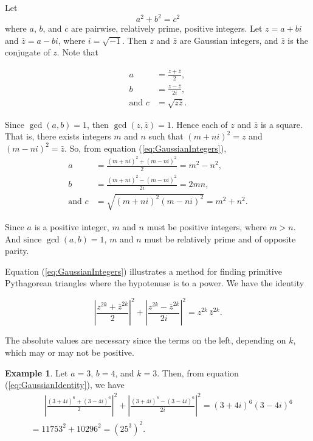 \documentclass{article}
\theoremstyle{definition}
\newtheorem{example}{Example}[section]
\begin{document}
Let
\begin{equation}
a^2 + b^2 = c^2
\label{eq:pythag}
\end{equation}
where \(a\), \(b\), and \(c\) are pairwise, relatively prime, positive integers. Let \(z=a+bi\) and  \(\bar{z}=a-bi\), where \(i=\sqrt{-1}\). Then \(z\) and \(\bar{z}\) are Gaussian integers, and \(\bar{z}\) is the conjugate of \(z\). Note that

\begin{equation}
\begin{aligned}
a &= \frac{z + \bar{z}}{2}, \\
b &= \frac{z - \bar{z}}{2i}, \\
\text{and } c &= \sqrt{z \bar{z}}.
\end{aligned}
\label{eq:GaussianIntegers}
\end{equation}

Since  \(\gcd(a,b)=1\), then  \(\gcd(z,\bar{z})=1\). Hence each of \(z\) and \(\bar{z}\) is a square. That is, there exists integers \(m\) and \(n\) such that  \((m+ni)^2 = z\) and  \((m-ni)^2 = \bar{z}\). So, from equation (\ref{eq:GaussianIntegers}), \[\begin{aligned} a &= \frac{(m+ni)^2 + (m-ni)^2}{2} = m^2-n^2, \\ b &= \frac{(m+ni)^2 - (m-ni)^2}{2i} = 2mn, \\ \text{and } c &= \sqrt{(m+ni)^2(m-ni)^2} = m^2+n^2. \end{aligned}\]

Since \(a\) is a positive integer, \(m\) and \(n\) must be positive integers, where \(m > n\). And since  \(\gcd(a,b) = 1\), \(m\) and \(n\) must be relatively prime and of opposite parity.

Equation (\ref{eq:GaussianIntegers}) illustrates a method for finding primitive Pythagorean triangles where the hypotenuse is to a power. We have the identity

\begin{equation}
\left\lvert \frac{z^{2k} + \bar{z}^{2k}}{2} \right\rvert^2 + \left\lvert \frac{z^{2k} - \bar{z}^{2k}}{2i} \right\rvert^2 = z^{2k}\,\bar{z}^{2k} .
\label{eq:GaussianIdentity}
\end{equation}

The absolute values are necessary since the terms on the left, depending on \(k\), which may or may not be positive.

\begin{example}
Let \(a = 3\), \(b = 4\), and \(k = 3\). Then, from equation (\ref{eq:GaussianIdentity}), we have \[ \begin{aligned} &\phantom{=\,\,} \left\lvert \frac{(3+4i)^6+(3-4i)^6}{2} \right\rvert^2 + \left\lvert \frac{(3+4i)^6-(3-4i)^6}{2i} \right\rvert^2 = (3+4i)^6 (3-4i)^6 \\ &= 11753^2 + 10296^2 = (25^3)^2. \end{aligned} \]
\end{example}
\end{document}

